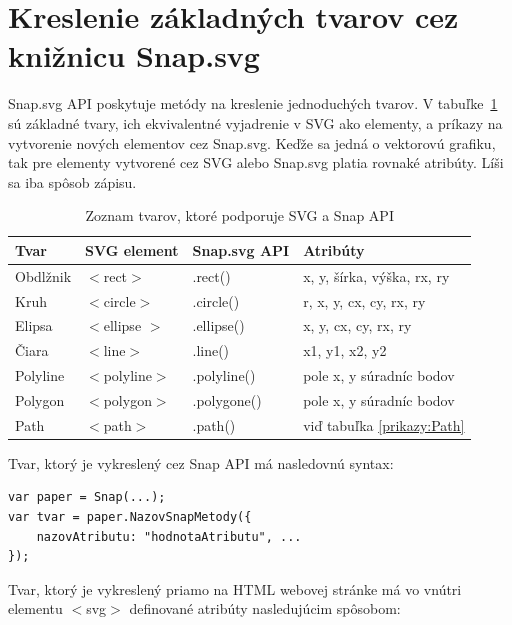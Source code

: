 \section{Kreslenie základných tvarov cez knižnicu Snap.svg}

Snap.svg API poskytuje metódy na kreslenie jednoduchých tvarov. V tabuľke~\ref{porovnanieSVG:Snap} sú základné tvary, ich ekvivalentné vyjadrenie v SVG ako elementy, a  príkazy na vytvorenie nových elementov cez Snap.svg. Keďže sa jedná o vektorovú grafiku, tak pre elementy vytvorené cez SVG alebo Snap.svg platia rovnaké atribúty. Líši sa iba spôsob zápisu. 

\begin{table}[H]
	\begin{center}
		\begin{tabular}{|l|l|l|l|}
			\hline \textbf{Tvar} & \textbf{SVG element} & \textbf{Snap.svg API} & \textbf{Atribúty} \\  \hline
			\hline Obdlžnik & $<$rect$>$ & .rect() & x, y, šírka, výška, rx, ry \\ 
			\hline Kruh & $<$circle$>$ & .circle() & r, x, y, cx, cy, rx, ry \\ 
			\hline Elipsa & $<$ellipse $>$ & .ellipse() & x, y, cx, cy, rx, ry \\ 
			\hline Čiara & $<$line$>$ & .line() & x1, y1, x2, y2 \\ 
			\hline Polyline & $<$polyline$>$ & .polyline() & pole x, y súradníc bodov \\ 
			\hline Polygon & $<$polygon$>$ & .polygone() & pole x, y súradníc bodov \\ 
			\hline Path & $<$path$>$ & .path() & viď tabuľka \ref{prikazy:Path}  \\ 
			\hline 
		\end{tabular} 
	\end{center}
	\label{porovnanieSVG:Snap}
	\caption{Zoznam tvarov, ktoré podporuje SVG a Snap API}
\end{table}

Tvar, ktorý je vykreslený cez Snap API má nasledovnú syntax: 

\begin{lstlisting}
var paper = Snap(...);
var tvar = paper.NazovSnapMetody({
	nazovAtributu: "hodnotaAtributu", ...
});
\end{lstlisting}

Tvar, ktorý je vykreslený priamo na HTML webovej stránke má vo vnútri elementu $<$svg$>$ definované atribúty nasledujúcim spôsobom: 

